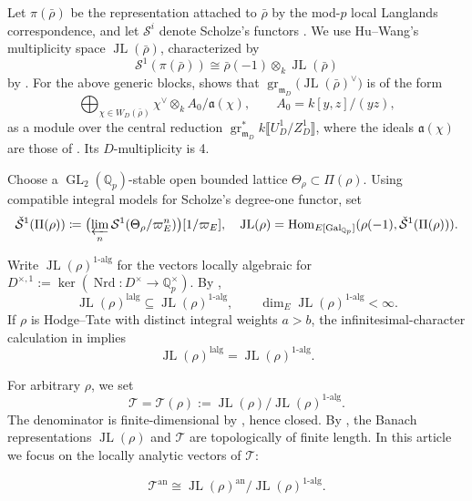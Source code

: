 \documentclass[11pt]{article}
\theoremstyle{definition}
\newcommand{\mD}{\mathfrak m_D}
\newcommand{\gr}{\operatorname{gr}}
\newcommand{\GL}{\operatorname{GL}}
\newcommand{\Nrd}{\operatorname{Nrd}}
\newcommand{\JL}{\operatorname{JL}}
\newcommand{\Tau}{\mathcal T}
\begin{document}
Let $\pi(\bar\rho)$ be the representation attached to $\bar\rho$ by the
mod-$p$ local Langlands correspondence, and let $\mathcal S^i$ denote
Scholze's functors \cite{Scholze2018}. We use Hu--Wang's multiplicity
space $\JL(\bar\rho)$, characterized by
\[
 \mathcal S^1(\pi(\bar\rho))
 \cong\bar\rho(-1)\otimes_k\JL(\bar\rho)
\]
by \cite[Theorem~4.20]{HuWangPadic}. 
For the above generic blocks, \cite[Theorem~4.19]{HuWangPadic} shows that $\gr_{\mD}\bigl(\JL(\bar\rho)^\vee\bigr)$ is of the form
\[
\bigoplus_{\chi\in W_D(\bar{\rho})}
 \chi^\vee\otimes_k A_0/\mathfrak{a}(\chi),
 \qquad A_0=k[y,z]/(yz),
\]
as a module over the central reduction 
$\gr_{\mD}^*k\llbracket U_D^1/Z_D^1\rrbracket$, where the ideals
$\mathfrak a(\chi)$ are those of \cite[Definition~4.18]{HuWangPadic}.
Its $D$-multiplicity is 4.

Choose a $\GL_2(\mathbb Q_p)$-stable open bounded lattice
$\Theta_\rho\subset\Pi(\rho)$.  Using compatible integral models for
Scholze's degree-one functor, set \[\check{\mathcal{S}}^1(\Pi(\rho))\coloneqq\bigl(\varprojlim_n\mathcal{S}^1(\Theta_\rho/\varpi_E^n)\bigr)[1/\varpi_E],\quad\JL(\rho)=\mathrm{Hom}_{E[\mathrm{Gal}_{\mathbb{Q}_p}]}(\rho(-1), \check{\mathcal{S}}^1(\Pi(\rho))). \]


Write $\JL(\rho)^{1\text{-}\mathrm{alg}}$ for the vectors locally
algebraic for $D^{\times,1}:=\ker(\Nrd:D^\times\to\mathbb Q_p^\times)$.
By \cite[Theorem~4.23]{LiuWang2025},
\[
 \JL(\rho)^{\mathrm{lalg}}
 \subseteq\JL(\rho)^{1\text{-}\mathrm{alg}},
 \qquad
 \dim_E\JL(\rho)^{1\text{-}\mathrm{alg}}<\infty.
\]
If $\rho$ is Hodge--Tate with distinct integral weights $a>b$, the
infinitesimal-character calculation in
\cite[\S8.3 and Corollary~8.16]{DPS23} implies
\[
 \JL(\rho)^{\mathrm{lalg}}
 =\JL(\rho)^{1\text{-}\mathrm{alg}}.
\]

For arbitrary $\rho$, we set
\[
 \Tau=\Tau(\rho):=\JL(\rho)/\JL(\rho)^{1\text{-}\mathrm{alg}}.
\]
The denominator is finite-dimensional by \cite[Theorem~5.3]{LiuWang2025}, hence closed. 
By \cite[Corollary~4.20 and Theorem~6.4]{LiuWang2025}, the Banach
representations $\JL(\rho)$ and $\Tau$ are topologically of finite
length. In this article we focus on the locally analytic vectors of $\Tau$:

 \[\Tau^{\mathrm{an}}
 \cong
 \JL(\rho)^{\mathrm{an}}/
 \JL(\rho)^{1\text{-}\mathrm{alg}}.\]
\end{document}
